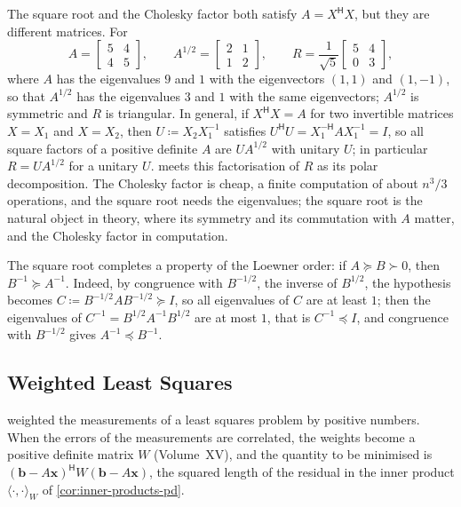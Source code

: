 The square root and the Cholesky factor both satisfy $A=X^{\mathsf H}X$, but they are different matrices. For
\[
A=\begin{bmatrix}5&4\\4&5\end{bmatrix},\qquad A^{1/2}=\begin{bmatrix}2&1\\1&2\end{bmatrix},\qquad R=\frac1{\sqrt5}\begin{bmatrix}5&4\\0&3\end{bmatrix},
\]
where $A$ has the eigenvalues $9$ and $1$ with the eigenvectors $(1,1)$ and $(1,-1)$, so that $A^{1/2}$ has the eigenvalues $3$ and $1$ with the same eigenvectors; $A^{1/2}$ is symmetric and $R$ is triangular. In general, if $X^{\mathsf H}X=A$ for two invertible matrices $X=X_1$ and $X=X_2$, then $U\coloneqq X_2X_1^{-1}$ satisfies $U^{\mathsf H}U=X_1^{-\mathsf H}AX_1^{-1}=I$, so all square factors of a positive definite $A$ are $UA^{1/2}$ with unitary $U$; in particular $R=UA^{1/2}$ for a unitary $U$.  meets this factorisation of $R$ as its polar decomposition. The Cholesky factor is cheap, a finite computation of about $n^3/3$ operations, and the square root needs the eigenvalues; the square root is the natural object in theory, where its symmetry and its commutation with $A$ matter, and the Cholesky factor in computation.

The square root completes a property of the Loewner order: if $A\succeq B\succ0$, then $B^{-1}\succeq A^{-1}$. Indeed, by congruence with $B^{-1/2}$, the inverse of $B^{1/2}$, the hypothesis becomes $C\coloneqq B^{-1/2}AB^{-1/2}\succeq I$, so all eigenvalues of $C$ are at least $1$; then the eigenvalues of $C^{-1}=B^{1/2}A^{-1}B^{1/2}$ are at most $1$, that is $C^{-1}\preceq I$, and congruence with $B^{-1/2}$ gives $A^{-1}\preceq B^{-1}$.

\subsection{Weighted Least Squares}

 weighted the measurements of a least squares problem by positive numbers. When the errors of the measurements are correlated, the weights become a positive definite matrix $W$ (Volume~XV), and the quantity to be minimised is $(\mathbf b-A\mathbf x)^{\mathsf H}W(\mathbf b-A\mathbf x)$, the squared length of the residual in the inner product $\langle\cdot,\cdot\rangle_W$ of \cref{cor:inner-products-pd}.

